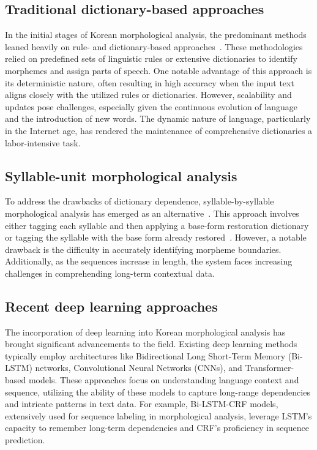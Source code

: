 \documentclass[AMS,STIX2COL]{WileyNJD-v2}
\begin{document}
    \subsection{Traditional dictionary-based approaches}\label{subsec:traditional-dictionary-based-approaches}
    In the initial stages of Korean morphological analysis, the predominant methods leaned heavily on rule- and dictionary-based approaches~\cite{KwonHC1991}.
    These methodologies relied on predefined sets of linguistic rules or extensive dictionaries to identify morphemes and assign parts of speech.
    One notable advantage of this approach is its deterministic nature, often resulting in high accuracy when the input text aligns closely with the utilized rules or dictionaries.
    However, scalability and updates pose challenges, especially given the continuous evolution of language and the introduction of new words.
    The dynamic nature of language, particularly in the Internet age, has rendered the maintenance of comprehensive dictionaries a labor-intensive task.

    \subsection{Syllable-unit morphological analysis}\label{subsec:syllable-unit-morphological-analysis}
    To address the drawbacks of dictionary dependence, syllable-by-syllable morphological analysis has emerged as an alternative~\cite{ShimKS2011, LeeCK2013, LeeCH2016, KimHM2016, Li2017, KimSW2018, ChoiYS2018, MinJW2019, KimHM2019, SongHJ2019, SongHJ2020, YounJY2021, ShinHJ2023}.
    This approach involves either tagging each syllable and then applying a base-form restoration dictionary~\cite{ShimKS2011, LeeCH2016} or tagging the syllable with the base form already restored~\cite{YounJY2021}.
    However, a notable drawback is the difficulty in accurately identifying morpheme boundaries.
    Additionally, as the sequences increase in length, the system faces increasing challenges in comprehending long-term contextual data.

    \subsection{Recent deep learning approaches}\label{subsec:recent-deep-learning-approaches}
    The incorporation of deep learning into Korean morphological analysis has brought significant advancements to the field.
    Existing deep learning methods typically employ architectures like Bidirectional Long Short-Term Memory (Bi-LSTM) networks, Convolutional Neural Networks (CNNs), and Transformer-based models.
    These approaches focus on understanding language context and sequence, utilizing the ability of these models to capture long-range dependencies and intricate patterns in text data.
    For example, Bi-LSTM-CRF models, extensively used for sequence labeling in morphological analysis, leverage LSTM's capacity to remember long-term dependencies and CRF's proficiency in sequence prediction.
\end{document}
